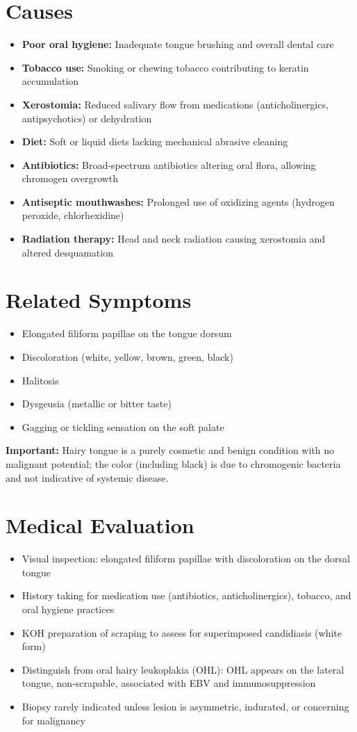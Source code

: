 \section*{Causes}
\begin{itemize}
  \item \textbf{Poor oral hygiene:} Inadequate tongue brushing and overall dental care
  \item \textbf{Tobacco use:} Smoking or chewing tobacco contributing to keratin accumulation
  \item \textbf{Xerostomia:} Reduced salivary flow from medications (anticholinergics, antipsychotics) or dehydration
  \item \textbf{Diet:} Soft or liquid diets lacking mechanical abrasive cleaning
  \item \textbf{Antibiotics:} Broad-spectrum antibiotics altering oral flora, allowing chromogen overgrowth
  \item \textbf{Antiseptic mouthwashes:} Prolonged use of oxidizing agents (hydrogen peroxide, chlorhexidine)
  \item \textbf{Radiation therapy:} Head and neck radiation causing xerostomia and altered desquamation
\end{itemize}

\section*{Related Symptoms}
\begin{itemize}
  \item Elongated filiform papillae on the tongue dorsum
  \item Discoloration (white, yellow, brown, green, black)
  \item Halitosis
  \item Dysgeusia (metallic or bitter taste)
  \item Gagging or tickling sensation on the soft palate
\end{itemize}
\textbf{Important:} Hairy tongue is a purely cosmetic and benign condition with no malignant potential; the color (including black) is due to chromogenic bacteria and not indicative of systemic disease.

\section*{Medical Evaluation}
\begin{itemize}
  \item Visual inspection: elongated filiform papillae with discoloration on the dorsal tongue
  \item History taking for medication use (antibiotics, anticholinergics), tobacco, and oral hygiene practices
  \item KOH preparation of scraping to assess for superimposed candidiasis (white form)
  \item Distinguish from oral hairy leukoplakia (OHL): OHL appears on the lateral tongue, non-scrapable, associated with EBV and immunosuppression
  \item Biopsy rarely indicated unless lesion is asymmetric, indurated, or concerning for malignancy
\end{itemize}


